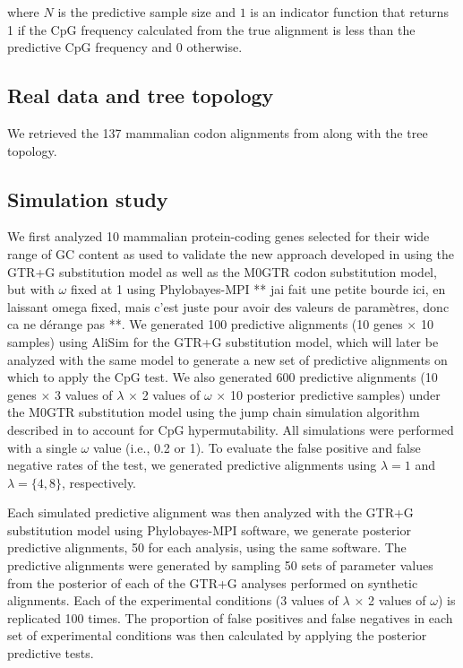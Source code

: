 \documentclass{article}
\begin{document}
where $N$ is the predictive sample size and $1$ is an indicator function that returns 1 if the CpG frequency calculated from the true alignment is less than the predictive CpG frequency and 0 otherwise.

\subsection*{Real data and tree topology}
We retrieved the 137 mammalian codon alignments from \citet{LaurinLemay2018a} along with the tree topology.

\subsection*{Simulation study}
We first analyzed 10 mammalian protein-coding genes selected for their wide range of GC content as used to validate the new approach developed in \citet{LaurinLemay2018b} using the GTR+G substitution model as well as the M0GTR codon substitution model, but with $\omega$ fixed at 1 \citep{Yang2000} using Phylobayes-MPI \citep{Lartillot2013} ** jai fait une petite bourde ici, en laissant omega fixed, mais c'est juste pour avoir des valeurs de paramètres, donc ca ne dérange pas **.  We generated 100 predictive alignments (10 genes $\times$ 10 samples) using AliSim \citep{LyTrong2022} for the GTR+G substitution model, which will later be analyzed with the same model to generate a new set of predictive alignments on which to apply the CpG test.  We also generated 600 predictive alignments (10 genes $\times$ 3 values of $\lambda$ $\times$ 2 values of $\omega$ $\times$ 10 posterior predictive samples) under the M0GTR substitution model using the jump chain simulation algorithm described in \citet{LaurinLemay2022} to account for CpG hypermutability. All simulations were performed with a single $\omega$ value (i.e., 0.2 or 1). To evaluate the false positive and false negative rates of the test, we generated predictive alignments using $\lambda = 1$ and $\lambda = \{4,8\}$, respectively.

Each simulated predictive alignment was then analyzed with the GTR+G substitution model using Phylobayes-MPI \citep{Lartillot2013} software, we generate posterior predictive alignments, 50 for each analysis, using the same software.  The predictive alignments were generated by sampling 50 sets of parameter values from the posterior of each of the GTR+G analyses performed on synthetic alignments. Each of the experimental conditions (3 values of $\lambda$ $\times$ 2 values of $\omega$) is replicated 100 times.  The proportion of false positives and false negatives in each set of experimental conditions was then calculated by applying the posterior predictive tests.
\end{document}
